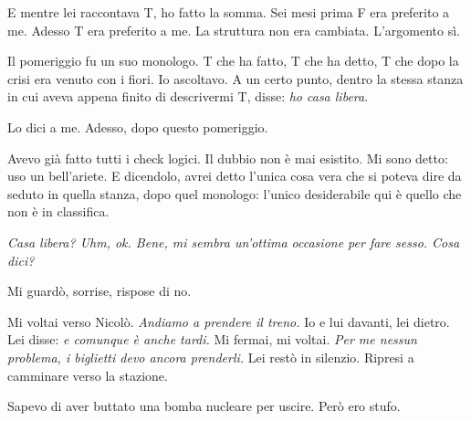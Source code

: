 \documentclass[
    oneside,                 %
    openany,                 %
    titlepage,
    11pt,
    a4paper,
    italian,
    DIV=14,                  %
    headinclude,
    footinclude=true,
    cleardoublepage=empty
]{scrbook}
\theoremstyle{ctplain}
\theoremstyle{ctdef}
\theoremstyle{ctrem}
\begin{document}
E mentre lei raccontava T, ho fatto la somma. Sei mesi prima F era preferito a me. Adesso T era preferito a me. La struttura non era cambiata. L'argomento sì.

Il pomeriggio fu un suo monologo. T che ha fatto, T che ha detto, T che dopo la crisi era venuto con i fiori. Io ascoltavo. A un certo punto, dentro la stessa stanza in cui aveva appena finito di descrivermi T, disse: \emph{ho casa libera}.

Lo dici a me. Adesso, dopo questo pomeriggio.

Avevo già fatto tutti i check logici. Il dubbio non è mai esistito. Mi sono detto: uso un bell'ariete. E dicendolo, avrei detto l'unica cosa vera che si poteva dire da seduto in quella stanza, dopo quel monologo: l'unico desiderabile qui è quello che non è in classifica.

\emph{Casa libera? Uhm, ok. Bene, mi sembra un'ottima occasione per fare sesso. Cosa dici?}

Mi guardò, sorrise, rispose di no.

Mi voltai verso Nicolò. \emph{Andiamo a prendere il treno.} Io e lui davanti, lei dietro. Lei disse: \emph{e comunque è anche tardi.} Mi fermai, mi voltai. \emph{Per me nessun problema, i biglietti devo ancora prenderli.} Lei restò in silenzio. Ripresi a camminare verso la stazione.

Sapevo di aver buttato una bomba nucleare per uscire. Però ero stufo.
\end{document}
